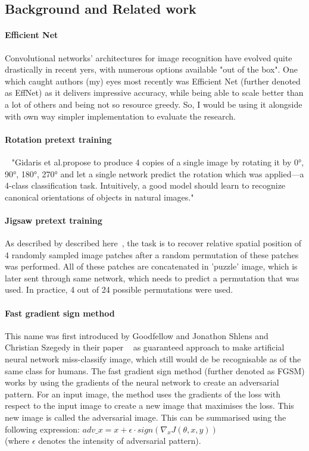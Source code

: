 \subsection{Background and Related work}
\paragraph{Efficient Net}
Convolutional networks' architectures for image recognition have evolved quite drastically in recent yers, with numerous options available "out of the box".
One which caught authors (my) eyes most recently was Efficient Net (further denoted as EffNet)\cite{DBLP:journals/corr/abs-1905-11946} as it delivers impressive accuracy, while being able to scale better than a lot of others and being not so resource greedy.
So, I would be using it alongside with own way simpler implementation to evaluate the research.

\paragraph{Rotation pretext training}
~\cite{kolesnikov2019revisiting} "Gidaris et al.propose to produce 4 copies of
a single image by rotating it by {0°, 90°, 180°, 270°} and let
a single network predict the rotation which was applied—a
4-class classification task.
Intuitively, a good model should learn to recognize canonical orientations of objects in natural images."

\paragraph{Jigsaw pretext training}
As described by described here~\cite{kolesnikov2019revisiting},
the task is to recover relative spatial position of
4 randomly sampled image patches after a random permutation of these patches was performed.
All of these patches are concatenated in 'puzzle' image, which is later sent through same network, which needs to predict a permutation that
was used.
In practice, 4 out of 24 possible permutations were used.

\paragraph{Fast gradient sign method}
This name was first introduced by Goodfellow and Jonathon Shlens and Christian Szegedy in their paper
~\cite{goodfellow2015explaining} as guaranteed approach to make artificial neural network miss-classify image,
which still would de be recognisable as of the same class for humans. \newline
The fast gradient sign method (further denoted as FGSM) works by using the gradients of the neural network to create an adversarial pattern.
For an input image, the method uses the gradients of the loss with respect to the input image to create a new image that maximises the loss.
This new image is called the adversarial image.
This can be summarised using the following expression: $adv\_x = x + \epsilon \cdot sign(\nabla_x J(\theta, x, y))$
\\ (where $\epsilon$ denotes the intensity of adversarial pattern).



